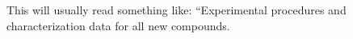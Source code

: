 \documentclass[journal=jacsat,manuscript=article]{achemso}
\begin{document}
\begin{suppinfo}

This will usually read something like: ``Experimental procedures and
characterization data for all new compounds.

\end{suppinfo}


\end{document}
